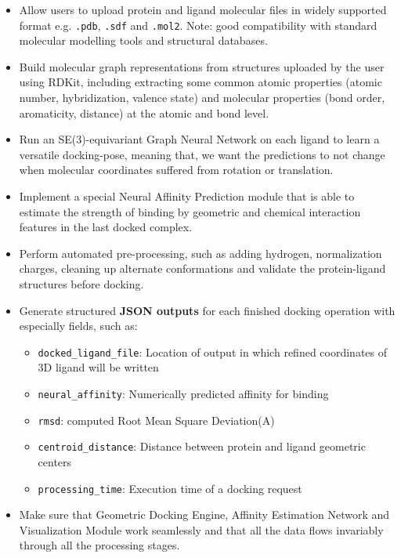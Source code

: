 \documentclass[12pt,a4]{report}
\begin{document}
\begin{itemize}

\item Allow users to upload protein and ligand molecular files in widely supported format e.g. \texttt{.pdb}, \texttt{.sdf} and \texttt{.mol2}. Note: good compatibility with standard molecular modelling tools and structural databases.

\item Build molecular graph representations from structures uploaded by the user using RDKit, including extracting some common atomic properties (atomic number, hybridization, valence state) and molecular properties (bond order, aromaticity, distance) at the atomic and bond level.

\item Run an SE(3)-equivariant Graph Neural Network on each ligand to learn a versatile docking-pose, meaning that, we want the predictions to not change when molecular coordinates suffered from rotation or translation.

\item Implement a special Neural Affinity Prediction module that is able to estimate the strength of binding by geometric and chemical interaction features in the last docked complex.

\item Perform automated pre-processing, such as adding hydrogen, normalization charges, cleaning up alternate conformations and validate the protein-ligand structures before docking.

\item Generate structured \textbf{JSON outputs} for each finished docking operation with especially fields, such as:
\begin{itemize}
\item \texttt{docked\_ligand\_file}: Location of output in which refined coordinates of 3D ligand will be written
\item \texttt{neural\_affinity}: Numerically predicted affinity for binding
\item \texttt{rmsd}: computed Root Mean Square Deviation(A)
\item \texttt{centroid\_distance}: Distance between protein and ligand geometric centers
\item \texttt{processing\_time}: Execution time of a docking request
\end{itemize}
\vspace{0.2cm}

\item Make sure that Geometric Docking Engine, Affinity Estimation Network and Visualization Module work seamlessly and that all the data flows invariably through all the processing stages.


\end{itemize}
\end{document}
